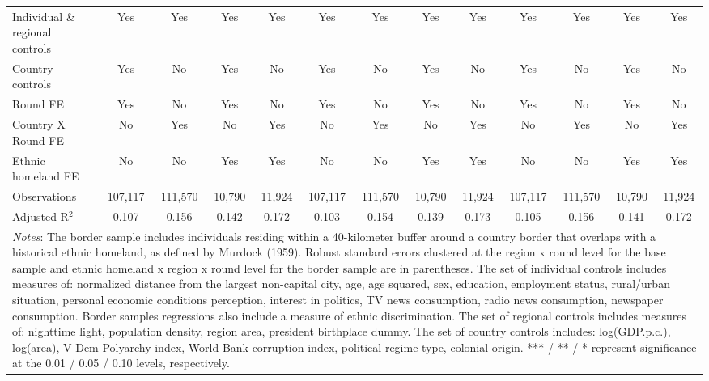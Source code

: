\documentclass[11pt]{article}
\theoremstyle{plain}
\theoremstyle{plain}
\begin{document}
\begin{table}[H]
{\begin{tabular}{@{\extracolsep{5pt}} l c c c c c c c c c c c c}
  \midrule
       \smallskip
      Individual \& regional controls  & Yes & Yes & Yes & Yes  & Yes & Yes & Yes & Yes & Yes & Yes & Yes & Yes \\
      \smallskip
      Country controls & Yes& No& Yes& No& Yes& No& Yes& No& Yes& No& Yes& No\\
      \smallskip
      Round FE & Yes & No& Yes & No & Yes & No& Yes & No & Yes & No& Yes & No\\
      \smallskip
      Country X Round FE       & No & Yes& No & Yes& No & Yes& No & Yes& No & Yes& No & Yes\\
      \smallskip
      Ethnic homeland FE & No & No & Yes& Yes& No & No & Yes& Yes& No & No & Yes& Yes\\
      \smallskip
      Observations            &      107,117   &      111,570   &       10,790   &       11,924   &      107,117   &      111,570   &       10,790   &       11,924 &      107,117   &      111,570   &       10,790   &       11,924   \\
      Adjusted-R$^2$         &       0.107   &       0.156   &       0.142   &       0.172 &       0.103   &       0.154   &       0.139   &       0.173  &       0.105   &       0.156   &       0.141   &       0.172\\
                            \bottomrule
      \multicolumn{13}{p{32cm}}{\footnotesize \emph{Notes}: The border sample includes individuals residing within a 40-kilometer buffer around a country border that overlaps with a historical ethnic homeland, as defined by Murdock (1959). Robust standard errors clustered at the region x round level  for the base sample and ethnic homeland x region x round level for the border sample are in parentheses. The set of individual controls
      includes measures of: normalized distance from the largest non-capital city, age, age squared, sex,
      education, employment status, rural/urban situation, personal economic conditions perception, interest in politics, TV news consumption, radio news consumption, newspaper consumption. Border samples regressions also include a measure of ethnic discrimination. The set of regional controls includes measures of: nighttime light, population density, region area, president birthplace dummy. The set of country controls includes: log(GDP.p.c.), log(area), V-Dem Polyarchy index, World Bank corruption index, political regime type, colonial origin. *** / ** / * represent significance at the 0.01 / 0.05 / 0.10 levels, respectively.}
      \end{tabular}
      }
      \end{table}
\end{document}
